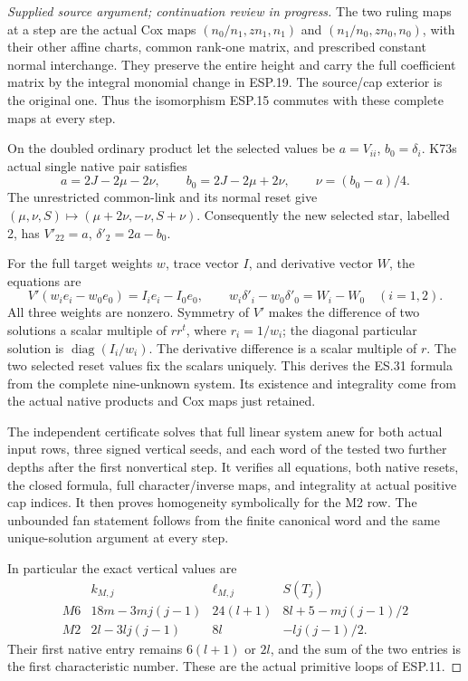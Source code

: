 \begin{proof}[Supplied source argument; continuation review in progress]
The two ruling maps at a step are the actual Cox maps
\((n_0/n_1,zn_1,n_1)\) and \((n_1/n_0,zn_0,n_0)\), with
their other affine charts, common rank-one matrix, and prescribed
constant normal interchange. They preserve the entire height and
carry the full coefficient matrix by the integral monomial change
in ESP.19. The source/cap exterior is the original one. Thus the
isomorphism ESP.15 commutes with these complete maps at every step.

On the doubled ordinary product let the selected values be
\(a=V_{ii}\), \(b_0=\delta_i\). K73\textquotesingle s actual single native pair
satisfies
\[
 a=2J-2\mu-2\nu,\qquad
 b_0=2J-2\mu+2\nu,
 \qquad \nu=(b_0-a)/4.
 \tag{ESP.29}
\]
The unrestricted common-link and its normal reset give
\((\mu,\nu,S)\mapsto(\mu+2\nu,-\nu,S+\nu)\).
Consequently the new selected star, labelled 2, has
\(V'_{22}=a\), \(\delta'_2=2a-b_0\).

For the full target weights \(w\), trace vector \(I\), and
derivative vector \(W\), the equations are
\[
 V'(w_ie_i-w_0e_0)=I_ie_i-I_0e_0,\qquad
 w_i\delta'_i-w_0\delta'_0=W_i-W_0\quad(i=1,2).
 \tag{ESP.30}
\]
All three weights are nonzero. Symmetry of \(V'\) makes the
difference of two solutions a scalar multiple of \(rr^t\),
where \(r_i=1/w_i\); the diagonal particular solution is
\(\operatorname{diag}(I_i/w_i)\). The derivative difference
is a scalar multiple of \(r\). The two selected reset values
fix the scalars uniquely. This derives the ES.31 formula from
the complete nine-unknown system. Its existence and integrality
come from the actual native products and Cox maps just retained.

The independent certificate solves that full linear system anew
for both actual input rows, three signed vertical seeds, and each
word of the tested two further depths after the first nonvertical
step. It verifies all equations, both native resets, the closed
formula, full character/inverse maps, and integrality at actual
positive cap indices. It then proves homogeneity symbolically
for the M2 row. The unbounded fan statement follows from the
finite canonical word and the same unique-solution argument
at every step.

In particular the exact vertical values are
\[
 \begin{array}{c|c|c|c}
 &k_{M,j}&\ell_{M,j}&S(T_j)\\\hline
 M6&18m-3mj(j-1)&24(l+1)&8l+5-mj(j-1)/2\\
 M2&2l-3lj(j-1)&8l&-lj(j-1)/2.
 \end{array}
 \tag{ESP.31}
\]
Their first native entry remains \(6(l+1)\) or \(2l\),
and the sum of the two entries is the first characteristic
number. These are the actual primitive loops of ESP.11.


\end{proof}
